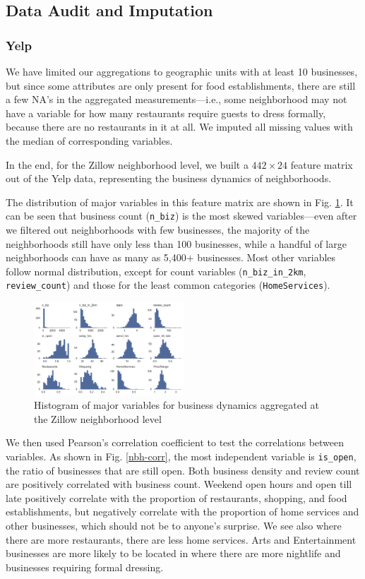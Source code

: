 \documentclass[compsoc]{IEEEtran}
\let\MYoriglatexcaption\caption
\renewcommand{\caption}[2][\relax]{\MYoriglatexcaption[#2]{#2}}
\begin{document}
\subsection{Data Audit and Imputation}

\subsubsection{Yelp }
We have limited our aggregations to geographic units with at least 10 businesses, but since some attributes are only present for food establishments, there are still a few NA's in the aggregated measurements---i.e., some neighborhood may not have a variable for how many restaurants require guests to dress formally, because there are no restaurants in it at all. We imputed all missing values with the median of corresponding variables.

In the end, for the Zillow neighborhood level, we built a $442 \times 24$ feature matrix out of the Yelp data, representing the business dynamics of neighborhoods.

The distribution of major variables in this feature matrix are shown in Fig. \ref{nbh-histo}. It can be seen that business count (\texttt{n\_biz}) is the most skewed variables---even after we filtered out neighborhoods with few businesses, the majority of the neighborhoods still have only less than 100 businesses, while a handful of large neighborhoods can have as many as 5,400+ businesses. Most other variables follow normal distribution, except for count variables (\texttt{n\_biz\_in\_2km}, \texttt{review\_count}) and those for the least common categories (\texttt{HomeServices}).

\begin{figure}[h]
  \hspace{-.5em}
    \includegraphics[width=0.5\textwidth]{nbh-histo}
  \caption{Histogram of major variables for business dynamics aggregated at the Zillow neighborhood level}
  \label{nbh-histo}
\end{figure}

We then used Pearson's correlation coefficient to test the correlations between variables. As shown in Fig. \ref{nbh-corr}, the most independent variable is \texttt{is\_open}, the ratio of businesses that are still open. Both business density and review count are positively correlated with business count. Weekend open hours and open till late positively correlate with the proportion of restaurants, shopping, and food establishments, but negatively correlate with the proportion of home services and other businesses, which should not be to anyone's surprise. We see also where there are more restaurants, there are less home services. Arts and Entertainment businesses are more likely to be located in where there are more nightlife and businesses requiring formal dressing.
\end{document}
